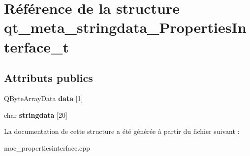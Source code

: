 \hypertarget{structqt__meta__stringdata__PropertiesInterface__t}{\section{Référence de la structure qt\+\_\+meta\+\_\+stringdata\+\_\+\+Properties\+Interface\+\_\+t}
\label{structqt__meta__stringdata__PropertiesInterface__t}
}
\subsection*{Attributs publics}
\begin{DoxyCompactItemize}
\item 
\hypertarget{structqt__meta__stringdata__PropertiesInterface__t_ad43677630df2ff0c5f133b49aca20e50}{Q\+Byte\+Array\+Data {\bfseries data} \mbox{[}1\mbox{]}}\label{structqt__meta__stringdata__PropertiesInterface__t_ad43677630df2ff0c5f133b49aca20e50}

\item 
\hypertarget{structqt__meta__stringdata__PropertiesInterface__t_a4fd957f3f38fd7f114e246789fa9a289}{char {\bfseries stringdata} \mbox{[}20\mbox{]}}\label{structqt__meta__stringdata__PropertiesInterface__t_a4fd957f3f38fd7f114e246789fa9a289}

\end{DoxyCompactItemize}


La documentation de cette structure a été générée à partir du fichier suivant \+:\begin{DoxyCompactItemize}
\item 
moc\+\_\+propertiesinterface.\+cpp\end{DoxyCompactItemize}
